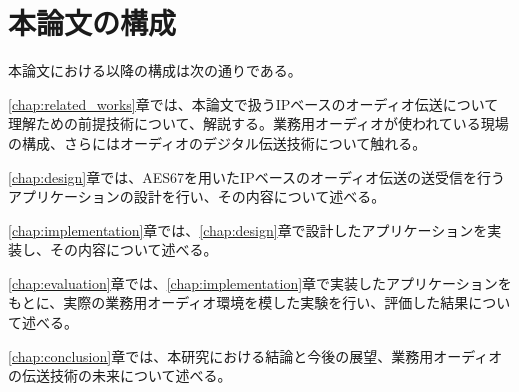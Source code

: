 \section{本論文の構成}

本論文における以降の構成は次の通りである。

\ref{chap:related_works}章では、本論文で扱うIPベースのオーディオ伝送について理解ための前提技術について、解説する。業務用オーディオが使われている現場の構成、さらにはオーディオのデジタル伝送技術について触れる。

\ref{chap:design}章では、AES67を用いたIPベースのオーディオ伝送の送受信を行うアプリケーションの設計を行い、その内容について述べる。

\ref{chap:implementation}章では、\ref{chap:design}章で設計したアプリケーションを実装し、その内容について述べる。

\ref{chap:evaluation}章では、\ref{chap:implementation}章で実装したアプリケーションをもとに、実際の業務用オーディオ環境を模した実験を行い、評価した結果について述べる。

\ref{chap:conclusion}章では、本研究における結論と今後の展望、業務用オーディオの伝送技術の未来について述べる。
